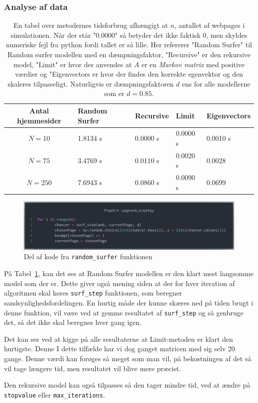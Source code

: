 \subsubsection*{Analyse af data}
\begin{table}[!h]
    \centering
    \begin{tabular}{c|l|l|l|l}
        Antal hjemmesider & Random Surfer & Recursive & Limit & Eigenvectors \\
        \hline
        $N = 10$       & 1.8134 s   & 0.0000 s   & 0.0000 s   & 0.0010 s   \\
        $N = 75$       & 3.4769 s   & 0.0110 s   & 0.0020 s   & 0.0028   \\
        $N = 250$      & 7.6943 s   & 0.0860 s   & 0.0090 s   & 0.0699
    \end{tabular}
    \caption{En tabel over metodernes tidsforbrug afhængigt at $n$, antallet af webpages i simulationen. Når der står "0.0000" så betyder det ikke faktisk 0, men skyldes numeriske fejl fra python fordi tallet er så lille. Her refererer "Random Surfer" til Random surfer modellen med en dæmpningsfaktor, "Recursive" er den rekursive model, "Limit" er hvor der anvendes at $A$ er en \textit{Markov matrix} med positive værdier og "Eigenvectors er hvor der findes den korrekte egenvektor og den skaleres tilpasseligt. Naturligvis er dæmpningsfaktoren $d$ ens for alle modellerne som er $d = 0.85$.}
    \label{tidsFigur}
\end{table}

\begin{figure}
    \centering
    \includegraphics[width = \linewidth]{Kode1.png}
    \caption{Del af kode fra \texttt{random\_surfer} funktionen}
\end{figure}


På Tabel~\ref{tidsFigur}, kan det ses at Random Surfer modellen er den klart mest langsomme model som der er. Dette giver også mening siden at der for hver iteration af algoritmen skal køres \texttt{surf\_step} funktionen, som beregner sandsynlighedsfordelingen. En hurtig måde der kunne skæres ned på tiden brugt i denne funktion, vil være ved at gemme resultatet af \texttt{surf\_step} og så genbruge det, så det ikke skal beregnes hver gang igen.

Det kan ses ved at kigge på alle resultaterne at Limit-metoden er klart den hurtigste. Denne I dette tilfælde har vi dog ganget matricen med sig selv 20 gange. Denne værdi kan forøges så meget som man vil, på bekostningen af det så vil tage længere tid, men resultatet vil blive mere præcist.

Den rekursive model kan også tilpasses så den tager mindre tid, ved at ændre på \texttt{stopvalue} eller \texttt{max\_iterations}.


